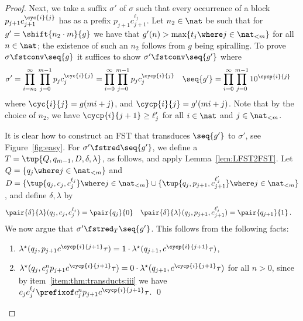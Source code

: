 \begin{proof}
  Next, we take a suffix $\sigma'$ of $\sigma$ such that every occurrence of a block $p_{j+1} c_{j+1}^{\cyc{i}{j}}$
  has as a prefix $p_{j+1} c_{j+1}^{\ell_j}$.
  Let $n_2 \in \nat$ be such that for $g' = \shift{n_2 \cdot m}{g}$
  we have that $g'(n) > \max\{t_j \where j \in \nat_{<m}\}$ for all $n \in \nat$;
  the existence of such an $n_2$ follows from $g$ being spiralling.
  To prove
  $\sigma \fstconv \seq{g}$
  it suffices to show
  $\sigma' \fstconv \seq{g'}$
  where
  \begin{align*}
    \sigma' &= \prod_{i = n_2}^{\infty} \prod_{j=0}^{m-1} p_j c_j^{\cyc{i}{j}} 
     = \prod_{i = 0}^{\infty} \prod_{j=0}^{m-1} p_j c_j^{\cycp{i}{j}} 
    &
    \seq{g'} &= \prod_{i = 0}^{\infty} \prod_{j=0}^{m-1} 1 0^{\cycp{i}{j}} 
  \end{align*}
  where $\cyc{i}{j} = g(mi + j)$, and $\cycp{i}{j} = g'(mi + j)$.
  Note that by the choice of $n_2$, we have
  $\cycp{i}{j+1} \ge \ell'_j$ for all $i \in \nat$ and $j \in \nat_{<m}$.

  It is clear how to construct an FST that transduces $\seq{g'}$ to $\sigma'$,
  see Figure~\ref{fig:easy}.
  For $\sigma' \fstred \seq{g'}$, we define a \lfst~$T = \tup{Q,q_{m-1},D,\delta,\lambda}$, as follows,
  and apply Lemma~\ref{lem:LFST2FST}.
  Let $Q = \{q_j \where j \in \nat_{<m}\}$ and $D = \{ \tup{q_j,c_j,c_j^{\ell_j}} \where j \in \nat_{<m}\} \cup \{ \tup{q_j,p_{j+1},c_{j+1}^{\ell'_j}} \where j \in \nat_{<m}\}$,
  and define $\delta,\lambda$ by
  \begin{align*}
\pair{\delta}{\lambda}(q_j,c_j,c_j^{\ell_j}) = \pair{q_j}{0} &&&
    \pair{\delta}{\lambda}(q_j,p_{j+1},c_{j+1}^{\ell_j'}) = \pair{q_{j+1}}{1} \,.
  \end{align*}
  We now argue that $\sigma' \fstred_T \seq{g'}$.
  This follows from the following facts:
  \begin{enumerate}[label=(\alph*)]
    \item $\lambda^\star(q_j,p_{j+1}c^{\cycp{i}{j+1}} \tau) = 1 \cdot \lambda^\star(q_{j+1}, c^{\cycp{i}{j+1}} \tau)$,
    \item $\lambda^\star(q_j,c_j^{n}p_{j+1}c^{\cycp{i}{j+1}} \tau) = 0 \cdot \lambda^\star(q_{j+1}, c^{\cycp{i}{j+1}} \tau)$
      for all $n > 0$, since by item~\ref{item:thm:transducts:iii} 
      we have $c_j c_j^{\ell_j} \prefixof c_j^{n}p_{j+1}c^{\cycp{i}{j+1}} \tau$.
      \qed
  \end{enumerate}
\end{proof}

